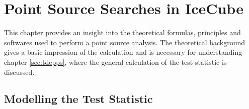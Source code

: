 \chapter{Point Source Searches in IceCube} \label{sec:theory}

This chapter provides an insight into the theoretical formulas, principles and softwares used to perform a point source analysis.
The theoretical background gives a basic impression of the calculation and is necessary for understanding chapter \ref{sec:tdepps}, where the general calculation of the test statistic is discussed.

\section{Modelling the Test Statistic}

